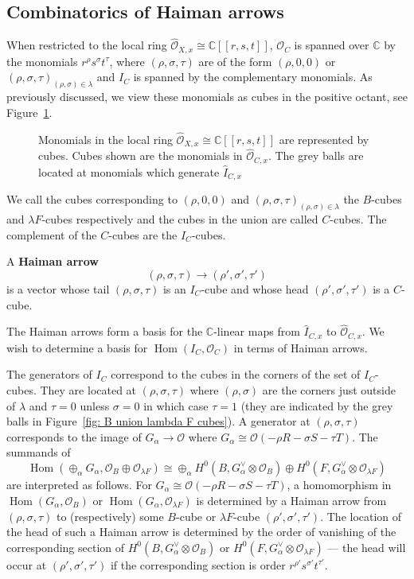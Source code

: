 \documentclass[12pt]{amsart}
\theoremstyle{definition}
\newcommand{\CC} {\mathbb{C}}          %
\renewcommand{\O}{\mathcal{O}}
\newcommand{\Hom}{\operatorname{Hom}}
\renewcommand{\hat}{\widehat}
\begin{document}
\subsection{Combinatorics of Haiman arrows}\label{subsec: combinatorics of Haiman arrows}

When restricted to the local ring $\widehat{\O}_{X,x} \cong \CC [[r,s,t]]$,
$\O_{C}$ is spanned over $\CC$ by the monomials
$r^{\rho}s^{\sigma}t^{\tau}$, where $(\rho ,\sigma ,\tau )$ are of the
form $(\rho ,0,0)$ or $(\rho ,\sigma ,\tau )_{(\rho ,\sigma )\in
\lambda}$ and $I_{C}$ is spanned by the complementary monomials. As
previously discussed, we view these monomials as cubes in the positive
octant, see Figure~\ref{fig: B union lambda F cubes}.


\begin{figure}

\caption{Monomials in the local ring
$\widehat{\O}_{X,x} \cong \CC [[r,s,t]]$ are represented by
cubes. Cubes shown are the monomials in
$\widehat{\O}_{C,x}$. The grey balls are located at monomials which
generate $\hat{I}_{C,x}$ }\label{fig: B union lambda F cubes}
\end{figure}

We call the cubes corresponding to $(\rho ,0,0)$ and $(\rho ,\sigma
,\tau )_{(\rho ,\sigma )\in \lambda}$ the $B$-cubes and $\lambda
F$-cubes respectively and the cubes in the union are called
$C$-cubes. The complement of the $C$-cubes are the $I_{C}$-cubes.

A \textbf{Haiman arrow} 
\[
(\rho ,\sigma ,\tau )\to (\rho ',\sigma ',\tau ')
\]
is a vector whose tail $(\rho ,\sigma ,\tau )$ is an $I_{C}$-cube and
whose head $(\rho ',\sigma ',\tau ')$ is a $C$-cube.

The Haiman arrows form a basis for the $\CC$-linear maps from
$\widehat{I}_{C,x}$ to $\hat{\O}_{C,x}$. We wish to determine a basis
for $\Hom (I_{C},\O_{C})$ in terms of Haiman arrows.

The generators of $I_{C}$ correspond to the cubes in the corners of
the set of $I_{C}$-cubes. They are located at $(\rho ,\sigma ,\tau )$
where $(\rho ,\sigma )$ are the corners just outside of $\lambda$ and
$\tau =0$ unless $\sigma =0$ in which case $\tau =1$ (they are
indicated by the grey balls in Figure~\ref{fig: B union lambda F
cubes}). A generator at $(\rho ,\sigma ,\tau )$ corresponds to the
image of $G_{\alpha}\to \O$ where $G_{\alpha}\cong \O (-\rho R-\sigma
S-\tau T)$. The summands of
\[
\Hom (\oplus_{\alpha}G_{\alpha},\O_{B}\oplus \O_{\lambda F}) \cong
\oplus_{\alpha} H^{0}(B,G_{\alpha}^{\vee}\otimes \O_{B})\oplus
H^{0}(F,G_{\alpha}^{\vee}\otimes \O_{\lambda F})
\]
are interpreted as follows. For $G_{\alpha}\cong \O (-\rho R-\sigma
S-\tau T)$, a homomorphism in $\Hom (G_{\alpha},\O_{B})$ or $\Hom
(G_{\alpha},\O_{\lambda F})$ is determined by a Haiman arrow from
$(\rho ,\sigma ,\tau )$ to (respectively) some $B$-cube or $\lambda
F$-cube $(\rho ',\sigma ',\tau ').$ The location of the head of such a
Haiman arrow is determined by the order of vanishing of the
corresponding section of $H^{0}(B,G_{\alpha}^{\vee}\otimes \O_{B})$ or
$H^{0}(F,G_{\alpha}^{\vee}\otimes \O_{\lambda F})$ --- the head will
occur at $(\rho ',\sigma ',\tau ')$ if the corresponding section is
order $r^{\rho '}s^{\sigma '}t^{\tau '}$.
\end{document}
